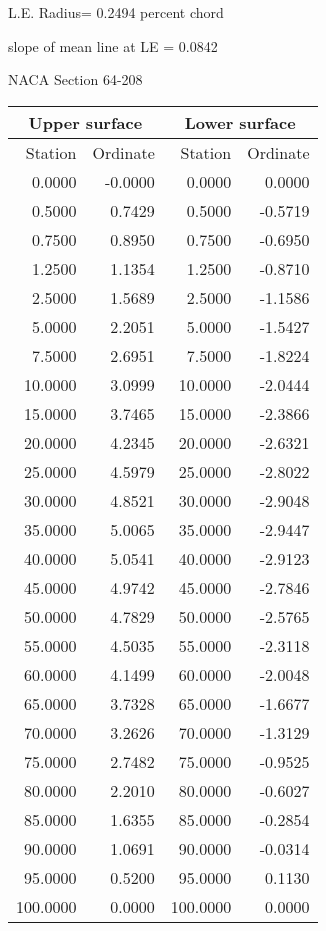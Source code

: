 \documentclass[11pt]{book}
\begin{document}
L.E. Radius=  0.2494 percent chord


 slope of mean line at LE =  0.0842
 \newpage
  \label{s64-208}
 \begin{Large}
 NACA Section 64-208
 \end{Large}
  
 \vspace{8mm}
 \begin{tabular}{|r|r|r|r|} \hline 
 \multicolumn{2}{|c|}{Upper surface} & \multicolumn{2}{|c|}{Lower surface} \\
 \hline
 Station & Ordinate & Station & Ordinate \\
 \hline
0.0000 & -0.0000 & 0.0000 & 0.0000 \\
0.5000 & 0.7429 & 0.5000 & -0.5719 \\
0.7500 & 0.8950 & 0.7500 & -0.6950 \\
1.2500 & 1.1354 & 1.2500 & -0.8710 \\
2.5000 & 1.5689 & 2.5000 & -1.1586 \\
5.0000 & 2.2051 & 5.0000 & -1.5427 \\
7.5000 & 2.6951 & 7.5000 & -1.8224 \\
10.0000 & 3.0999 & 10.0000 & -2.0444 \\
15.0000 & 3.7465 & 15.0000 & -2.3866 \\
20.0000 & 4.2345 & 20.0000 & -2.6321 \\
25.0000 & 4.5979 & 25.0000 & -2.8022 \\
30.0000 & 4.8521 & 30.0000 & -2.9048 \\
35.0000 & 5.0065 & 35.0000 & -2.9447 \\
40.0000 & 5.0541 & 40.0000 & -2.9123 \\
45.0000 & 4.9742 & 45.0000 & -2.7846 \\
50.0000 & 4.7829 & 50.0000 & -2.5765 \\
55.0000 & 4.5035 & 55.0000 & -2.3118 \\
60.0000 & 4.1499 & 60.0000 & -2.0048 \\
65.0000 & 3.7328 & 65.0000 & -1.6677 \\
70.0000 & 3.2626 & 70.0000 & -1.3129 \\
75.0000 & 2.7482 & 75.0000 & -0.9525 \\
80.0000 & 2.2010 & 80.0000 & -0.6027 \\
85.0000 & 1.6355 & 85.0000 & -0.2854 \\
90.0000 & 1.0691 & 90.0000 & -0.0314 \\
95.0000 & 0.5200 & 95.0000 & 0.1130 \\
100.0000 & 0.0000 & 100.0000 & 0.0000 \\
 \hline 
 \end{tabular}
\end{document}
